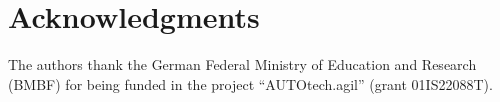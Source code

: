 \section{Acknowledgments}

The authors thank the German Federal Ministry of Education and Research (BMBF)
for being funded in the project \enquote{AUTOtech.agil} (grant 01IS22088T).

